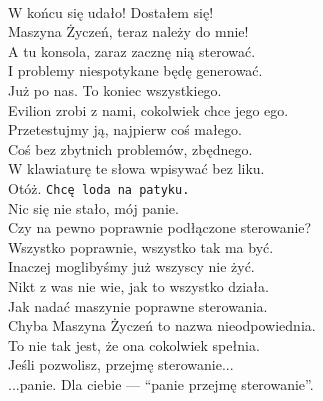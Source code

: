 \\

\chardok{}
W końcu się udało! Dostałem się!\\
Maszyna Życzeń, teraz należy do mnie!\\
A tu konsola, zaraz zacznę nią sterować.\\
I problemy niespotykane będę generować.\\

\charmik{}
Już po nas. To koniec wszystkiego.\\
Evilion zrobi z nami, cokolwiek chce jego ego.\\

\chardok{}
Przetestujmy ją, najpierw coś małego.\\
Coś bez zbytnich problemów, zbędnego.\\
W klawiaturę te słowa wpisywać bez liku.\\
Otóż. \texttt{Chcę loda na patyku.}\\

\charprzy{}
Nic się nie stało, mój panie.\\
Czy na pewno poprawnie podłączone sterowanie?\\

\charmik{}
Wszystko poprawnie, wszystko tak ma być.\\
Inaczej moglibyśmy już wszyscy nie żyć.\\
Nikt z was nie wie, jak to wszystko działa.\\
Jak nadać maszynie poprawne sterowania.\\

\charprzy{}
Chyba Maszyna Życzeń to nazwa nieodpowiednia.\\
To nie tak jest, że ona cokolwiek spełnia.\\
Jeśli pozwolisz, przejmę sterowanie...\\

\chardok{}
...panie.
Dla ciebie --- "`panie przejmę sterowanie"'.\\

\\

